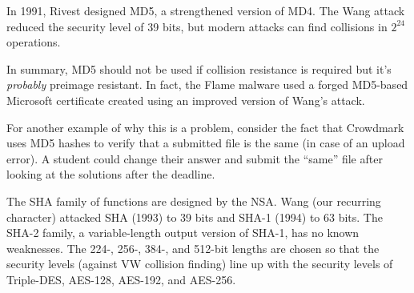 \documentclass[class=co487,tikz,minted,notes]{agony}
\begin{document}
In 1991, Rivest designed MD5, a strengthened version of MD4.
The Wang attack reduced the security level of 39 bits,
but modern attacks can find collisions in $2^{24}$ operations.

In summary, MD5 should not be used if collision resistance is required
but it's \emph{probably} preimage resistant.
In fact, the Flame malware used a forged MD5-based Microsoft certificate
created using an improved version of Wang's attack.

For another example of why this is a problem,
consider the fact that Crowdmark uses MD5 hashes to verify
that a submitted file is the same (in case of an upload error).
A student could change their answer and submit the ``same''
file after looking at the solutions after the deadline.

The SHA family of functions are designed by the NSA.
Wang (our recurring character) attacked SHA (1993) to 39 bits and SHA-1 (1994) to 63 bits.
The SHA-2 family, a variable-length output version of SHA-1, has no known weaknesses.
The 224-, 256-, 384-, and 512-bit lengths are chosen so that the security levels
(against VW collision finding) line up with the security levels of
Triple-DES, AES-128, AES-192, and AES-256.
\end{document}
